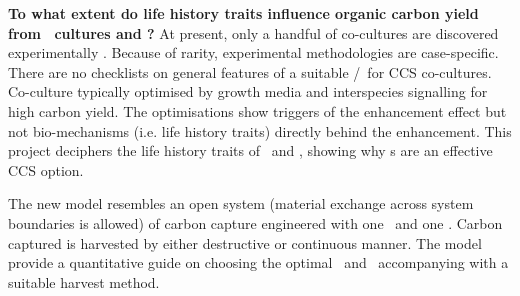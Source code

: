 \documentclass[../thesis.tex]{subfiles} %
\begin{document}
\textbf{To what extent do life history traits influence organic carbon yield from \phy\ cultures and \pbs?}  At present, only a handful of co-cultures are discovered experimentally \autocite{fuentes2016impact,santos2014microalgal}.  Because of rarity, experimental methodologies are case-specific.  There are no checklists on general features of a suitable \phy/\bacm\ for CCS co-cultures.  Co-culture typically optimised by growth media \autocite{aytekin2016statistical,fuentes2016impact} and interspecies signalling \autocite{fuentes2016impact} for high carbon yield.  The optimisations show triggers of the enhancement effect but not bio-mechanisms (i.e. life history traits) directly behind the enhancement.  This project deciphers the life history traits of \phy\ and \bac, showing why \pbs s are an effective CCS option.

The new model resembles an open system (material exchange across system boundaries is allowed) of carbon capture engineered with one \phy\ and one \bacm.  Carbon captured is harvested by either destructive or continuous manner.  The model provide a quantitative guide on choosing the optimal \phy\ and \bac\ accompanying with a suitable harvest method.
\end{document}
